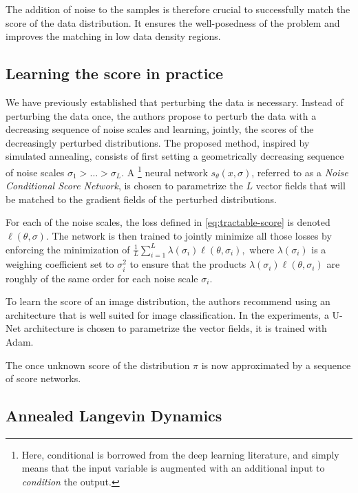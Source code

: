 \documentclass[10pt,journal,a4paper]{IEEEtran}
\theoremstyle{definition}
\begin{document}
The addition of noise to the samples is therefore crucial to successfully match the score of the data distribution. It ensures the well-posedness of the problem and improves the matching in low data density regions.

\subsection{Learning the score in practice}

We have previously established that perturbing the data is necessary. Instead of perturbing the data once, the authors propose to perturb the data with a decreasing sequence of noise scales and learning, jointly, the scores of the decreasingly perturbed distributions. The proposed method, inspired by simulated annealing, consists of first setting a geometrically decreasing sequence of noise scales $\sigma_1 > \dots > \sigma_L$. A \footnote{Here, conditional is borrowed from the deep learning literature, and simply means that the input variable is augmented with an additional input to \textit{condition} the output.} neural network $s_\theta(x, \sigma)$, referred to as a \textit{Noise Conditional Score Network}, is chosen to parametrize the $L$  vector fields that will be matched to the gradient fields of the perturbed distributions.

For each of the noise scales, the loss defined in \eqref{eq:tractable-score} is denoted $\ell(\theta, \sigma)$. The network is then trained to jointly minimize all those losses by enforcing the minimization of
\(
\frac{1}{L} \sum_{i=1}^{L}\lambda(\sigma_i) \ell(\theta, \sigma_i),
\)
where $\lambda(\sigma_i)$ is a weighing coefficient set to $\sigma_i^2$ to ensure that the products \(\lambda(\sigma_i) \ell(\theta, \sigma_i)\) are roughly of the same order for each noise scale $\sigma_i$. 

To learn the score of an image distribution, the authors recommend using an architecture that is well suited for image classification. In the experiments, a U-Net architecture is chosen to parametrize the vector fields, it is trained with Adam. 

The once unknown score of the distribution $\pi$ is now approximated by a sequence of score networks. 


\subsection{Annealed Langevin Dynamics}
\end{document}
